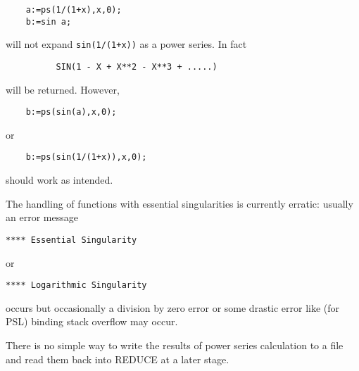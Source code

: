 \begin{verbatim}
    a:=ps(1/(1+x),x,0);
    b:=sin a;
\end{verbatim}

will not expand {\tt sin(1/(1+x))} as a power series. In fact

\begin{verbatim}
          SIN(1 - X + X**2 - X**3 + .....)
\end{verbatim}

will be returned. However,

\begin{verbatim} 
    b:=ps(sin(a),x,0);
\end{verbatim}

or

\begin{verbatim} 
    b:=ps(sin(1/(1+x)),x,0);
\end{verbatim}

should work as intended.

The handling of functions with essential singularities is currently
erratic: usually an error message

\hspace*{2em} {\tt ***** Essential Singularity}

or

\hspace*{2em} {\tt ***** Logarithmic Singularity}

occurs but occasionally a division by
zero error or some drastic error like (for PSL) binding stack
overflow may occur.
 
There is no simple way to write the results of power series
calculation to a file and read them back into REDUCE at a later
stage.

